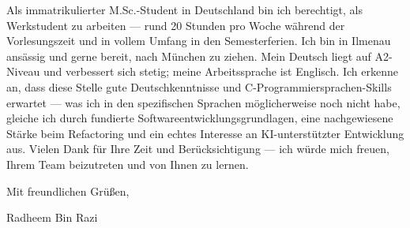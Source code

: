 \documentclass[11pt,a4paper]{coverletter}
\begin{document}
Als immatrikulierter M.Sc.-Student in Deutschland bin ich berechtigt, als Werkstudent zu arbeiten — rund 20 Stunden pro Woche während der Vorlesungszeit und in vollem Umfang in den Semesterferien. Ich bin in Ilmenau ansässig und gerne bereit, nach München zu ziehen. Mein Deutsch liegt auf A2-Niveau und verbessert sich stetig; meine Arbeitssprache ist Englisch. Ich erkenne an, dass diese Stelle gute Deutschkenntnisse und C-Programmiersprachen-Skills erwartet — was ich in den spezifischen Sprachen möglicherweise noch nicht habe, gleiche ich durch fundierte Softwareentwicklungsgrundlagen, eine nachgewiesene Stärke beim Refactoring und ein echtes Interesse an KI-unterstützter Entwicklung aus. Vielen Dank für Ihre Zeit und Berücksichtigung — ich würde mich freuen, Ihrem Team beizutreten und von Ihnen zu lernen.

\closing{Mit freundlichen Grüßen,}{Radheem Bin Razi}
\end{document}
